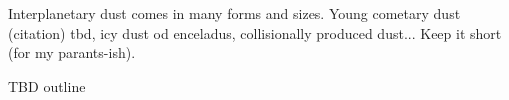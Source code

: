 Interplanetary dust comes in many forms and sizes. Young cometary dust (citation) tbd, icy dust od enceladus, collisionally produced dust... Keep it short (for my parants-ish). 

TBD outline